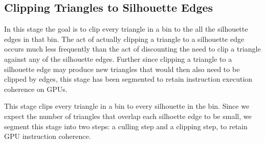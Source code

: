 \documentclass[review]{acmsiggraph}
\begin{document}

\subsection{Clipping Triangles to Silhouette Edges}
	In this stage the goal is to clip every triangle in a bin to the all the silhouette edges in that bin. The act of actually clipping a triangle to a silhouette edge occurs much less frequently than the act of discounting the need to clip a triangle against any of the silhouette edges. Further since clipping a triangle to a silhouette edge may produce new triangles that would then also need to be clipped by edges, this stage has been segmented to retain instruction execution coherence on GPUs.

This stage clips every triangle in a bin to every silhouette in the bin. Since
we expect the number of triangles that overlap each silhoette edge to be
small, we segment this stage into two steps: a culling step and a clipping
step, to retain GPU instruction coherence.

\end{document}
